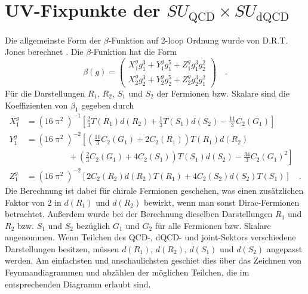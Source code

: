 \clearpage
\section{UV-Fixpunkte der $SU_\text{QCD}\times SU_\text{dQCD}$}

  Die allgemeinste Form der $\beta$-Funktion auf 2-loop Ordnung wurde von 
  D.R.T. Jones berechnet \cite{Jones}.
  Die $\beta$-Funktion hat die Form
  \begin{equation}
   \beta (g) = \begin{pmatrix}
                     X_1^g g_1^3 + Y_1^g g_1^5 + Z_1^g g_1^3 g_2^2 \\ 
                     X_2^g g_2^3 + Y_2^g g_2^5 + Z_2^g g_2^3 g_1^2 
                    \end{pmatrix}\quad . \label{eq:beta_QCDxdQCD:beta_g}
  \end{equation}
  Für die Darstellungen $R_1$, $R_2$, $S_1$ und $S_2$ der Fermionen bzw. Skalare 
  sind die Koeffizienten von $\beta_1$ gegeben durch 
  \begin{align}
   X_1^g &= (16 \uppi^2)^{-1}\left[ \frac{2}{3} T(R_1) d(R_2) + \frac{1}{3} 
    T(S_1)d(S_2)-\frac{11}{3} C_2(G_1) \right] \\
   Y_1^g &= (16 \uppi^2)^{-2} \left[ 
    \left( 
    \frac{10}{3} C_2(G_1)+2C_2(R_1)
    \right) T(R_1) d(R_2) \right. \\
     & \quad \quad \quad \quad \quad + \left. \left(
    \frac{2}{3} C_2(G_1) +4C_2(S_1) 
    \right)T(S_1) d(S_2)
    -\frac{34}{3} C_2(G_1)^2
    \right] \\
   Z_1^g &= (16 \uppi^2)^{-2} \left[
      2 C_2(R_2) d(R_2) T(R_1) +4C_2(S_2)d(S_2) T(S_1)
    \right] \quad .
  \end{align}
  Die Berechnung ist dabei für chirale Fermionen geschehen, was einen 
  zusätzlichen Faktor von $2$ in $d(R_1)$ und $d(R_2)$ bewirkt, wenn man sonst 
  Dirac-Fermionen betrachtet. Außerdem wurde bei der Berechnung dieselben 
  Darstellungen $R_1$ und $R_2$ bzw. $S_1$ und $S_2$ bezüglich $G_1$ und $G_2$ 
  für alle Fermionen bzw. Skalare angenommen. Wenn Teilchen des QCD-, dQCD- und 
  joint-Sektors verschiedene Darstellungen besitzen, müssen $d(R_1)$, $d(R_2)$, 
  $d(S_1)$ und $d(S_2)$ angepasst werden. Am einfachsten und anschaulichsten 
  geschiet dies über das Zeichnen von Feynmandiagrammen und abzählen der 
  möglichen Teilchen, die im entsprechenden Diagramm erlaubt sind.

%   
%   
  
